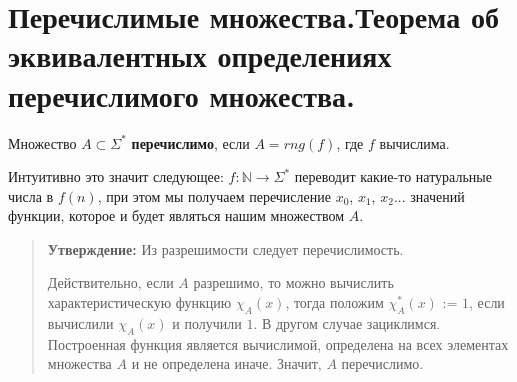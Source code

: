 \section{Перечислимые множества.Теорема об эквивалентных определениях перечислимого множества.}
\begin{definition} Множество $A \subset \Sigma^*$ \textbf{перечислимо}, если $A=rng(f)$, где $f$ вычислима.
\end{definition}
Интуитивно это значит следующее: $f: \mathbb{N} \to \Sigma^*$ переводит какие-то натуральные числа в $f(n)$, при
этом мы получаем перечисление $x_{0}$, $x_{1}$, $x_{2}$... значений функции, которое и будет являться нашим
множеством $A$.

\begin{quote} {\textbf{Утверждение: }}
	Из разрешимости следует перечислимость.
	\par Действительно, если $A$ разрешимо, то можно вычислить характеристическую функцию $\chi_{A}(x)$, тогда положим
	$\chi^*_{A}(x)$ := $1$, если вычислили  $\chi_{A}(x)$ и получили $1$. В другом случае зациклимся. Построенная
	функция является вычислимой, определена на всех элементах множества $A$ и не определена иначе. Значит, $A$
	перечислимо.
\end{quote}
